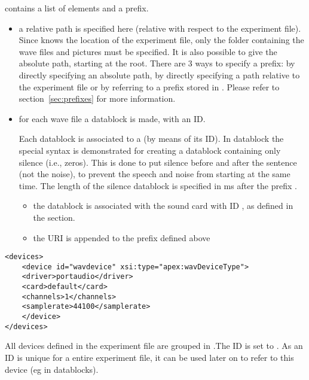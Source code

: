  contains a list of 
elements and a prefix.
\begin{itemize}
\item {} a relative path is specified here
(relative with respect to the experiment file). Since \apex knows
the location of the experiment file, only the folder containing
the wave files and pictures must be specified. It is also possible
to give the absolute path, starting at the root. There are 3 ways
to specify a prefix: by directly specifying an absolute path, by
directly specifying a path relative to the experiment file or by
referring to a prefix stored in . Please
refer to section~\ref{sec:prefixes} for more information.

\item {} for each wave file a datablock is made,
with an ID.

Each datablock is associated to a  (by means of
its ID). In datablock  the special syntax is
demonstrated for creating a datablock containing only silence
(i.e., zeros). This is done to put silence before and after the
sentence (not the noise), to prevent the speech and noise from
starting at the same time. The length of the silence datablock is
specified in ms after the prefix .

\begin{itemize}
\item the datablock is associated with the sound card with ID
, as defined in the  section.

\item {} the URI is appended to the prefix defined
above

\end{itemize}
\end{itemize}






\begin{lstlisting}
<devices>
    <device id="wavdevice" xsi:type="apex:wavDeviceType">
    <driver>portaudio</driver>
    <card>default</card>
    <channels>1</channels>
    <samplerate>44100</samplerate>
    </device>
</devices>
\end{lstlisting}

All devices defined in the experiment file are grouped in
.The ID is set to . As an ID is
unique for a entire experiment file, it can be used later on to
refer to this device (eg in datablocks).

